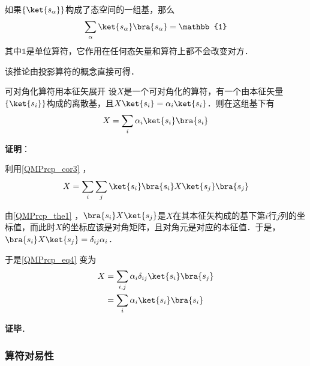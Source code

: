 \begin{corollary}{}\label{QMPrcp_cor3}
如果$\{\ket{s_\alpha}\}$构成了态空间的一组基，那么
\begin{equation}
\sum_\alpha \ket{s_\alpha}\bra{s_\alpha} = \mathbb{1}
\end{equation}
其中$\mathbb{1}$是单位算符，它作用在任何态矢量和算符上都不会改变对方．
\end{corollary}

该推论由投影算符的概念直接可得．






\begin{corollary}{可对角化算符用本征矢展开}\label{QMPrcp_cor2}
设$X$是一个可对角化的算符，有一个由本征矢量$\{\ket{s_i}\}$构成的离散基，且$X\ket{s_i}=\alpha_i\ket{s_i}$．则在这组基下有
\begin{equation}
X=\sum_{i}\alpha_i\ket{s_i}\bra{s_i}
\end{equation}
\end{corollary}

\textbf{证明}：


利用\autoref{QMPrcp_cor3} ，
\begin{equation}\label{QMPrcp_eq4}
X=\sum_{i}\sum_{j}\ket{s_i}\bra{s_i}X\ket{s_j}\bra{s_j}
\end{equation}

由\autoref{QMPrcp_the1} ，$\bra{s_i}X\ket{s_j}$是$X$在其本征矢构成的基下第$i$行$j$列的坐标值，而此时$X$的坐标应该是对角矩阵，且对角元是对应的本征值．于是，$\bra{s_i}X\ket{s_j}=\delta_{ij}\alpha_i$．

于是\autoref{QMPrcp_eq4} 变为
\begin{equation}
\begin{aligned}
X&=\sum_{i, j}\alpha_i\delta_{ij}\ket{s_i}\bra{s_j}\\
&=\sum_i\alpha_i\ket{s_i}\bra{s_i}
\end{aligned}
\end{equation}



\textbf{证毕}．











\subsubsection{算符对易性}



